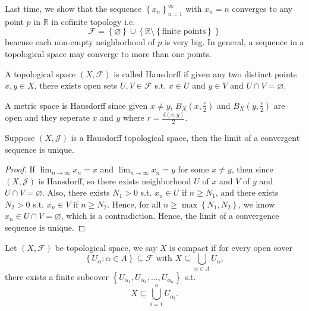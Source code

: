 Last time, we show that the sequence \(\left\{ x_n \right\}_{n=1}^{\infty}  \) with \(x_n = n\) converges to any point \(p\) in \(\mathbb{R} \) in cofinite topology i.e. 
\[
    \mathcal{F} = \left\{ \varnothing  \right\} \cup \left\{ \mathbb{R} \setminus \left\{ \text{finite points} \right\}  \right\}
\] beacuse each non-empty neighborhood of \(p\) is very big.  
In general, a sequence in a topological space may converge to more than one points. 
\begin{definition}[Hausdorff] \label{def: Hausdorff}
    A topological space \((X, \mathcal{F} )\)  is called Hausdorff if given any two distinct points \(x, y \in X\), there exists open sets \(U, V \in \mathcal{F} \) s.t. \(x \in U\) and \(y \in V\) and \(U \cap V = \varnothing \).     
\end{definition}

\begin{eg}
    A metric space is Hausdorff since given \(x \neq y\), \(B_X \left( x, \frac{r}{2} \right) \) and \(B_X \left( y, \frac{r}{2} \right) \) are open and they seperate \(x\) and \(y\) where \(r = \frac{d(x,y) }{2}\).     
\end{eg}

\begin{theorem} \label{thm: Hausdorff implies converge to exactly one point}
    Suppose \((X, \mathcal{J} )\) is a Hausdorff topological space, then the limit of a convergent sequence is unique.  
\end{theorem}
\begin{proof}
    If \(\lim_{n \to \infty} x_n = x\) and \(\lim_{n \to \infty} x_n = y \) for some \(x \neq y\), then since \((X, \mathcal{J} )\) is Hausdorff, so there exists neighborhood \(U\) of \(x\) and \(V\) of \(y\) and \(U \cap V = \varnothing \). Also, there exists \(N_1 > 0\) s.t. \(x_n \in U\) if \(n \ge N_1\), and there exists \(N_2 > 0\) s.t. \(x_n \in V\) if \(n \ge N_2\). Hence, for all \(n \ge \max \left\{ N_1, N_2 \right\} \), we know \(x_n \in U \cap V = \varnothing \), which is a contradiction. Hence, the limit of a convergence sequence is unique.                 
\end{proof}

\begin{definition}[Compact] \label{def: compact in topological space}
    Let \((X, \mathcal{F} )\) be topological space, we say \(X\) is compact if for every open cover 
    \[
        \left\{ U_\alpha  : \alpha \in A \right\} \subseteq \mathcal{F} \text{ with } X \subseteq \bigcup_{\alpha \in A} U_\alpha,  
    \] there exists a finite subcover \(\left\{ U_{\alpha _1}, U_{\alpha _2}, \dots , U_{\alpha _n} \right\} \) s.t. 
    \[
        X \subseteq \bigcup_{i=1}^n U_{\alpha _i}.  
    \] 
\end{definition}

